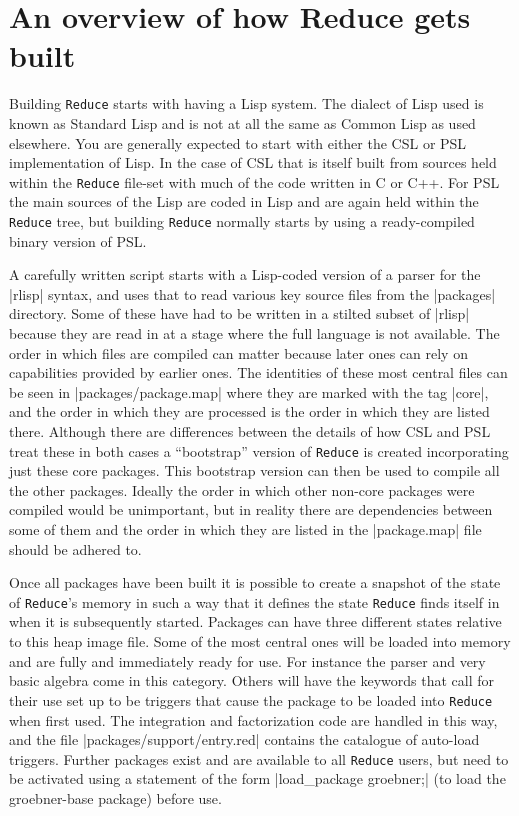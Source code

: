 \documentclass[12pt,twoside,openright]{memoir}
\newcommand{\reduce}{\texttt{Reduce}\xspace}
\begin{document}
\section{An overview of how Reduce gets built}

Building \reduce starts with having a Lisp system. The dialect of Lisp
used is known as Standard Lisp and is not at all the same as Common Lisp
as used elsewhere. You are generally expected to start with either the CSL
or PSL implementation of Lisp. In the case of CSL that is itself built
from sources held within the \reduce file-set with much of the code written
in C or C++. For PSL the main sources of the Lisp are coded in Lisp and are
again held within the \reduce tree, but building \reduce normally
starts by using a ready-compiled binary version of PSL.

A carefully written script starts with a Lisp-coded version of a parser for the
|rlisp| syntax, and uses that to read various key source files from the
|packages| directory. Some of these have had to be written in a stilted subset
of |rlisp| because they are read in at a stage where the full language is not
available. The order in which files are compiled can matter because later ones
can rely on capabilities provided by earlier ones. The identities of these most
central files can be seen in |packages/package.map| where they are marked with
the tag |core|\label{p:corepackages}, and the order in which they are processed
is the order in which they are listed there.  Although there are differences
between the details of how CSL and PSL treat these in both cases a
``bootstrap'' version of \reduce is created incorporating just these core
packages. This bootstrap version can then be used to compile all the other
packages. Ideally the order in which other non-core packages were compiled
would be unimportant, but in reality there are dependencies between some of
them and the order in which they are listed in the |package.map| file should be
adhered to.

Once all packages have been built it is possible to create a snapshot
of the state of \reduce's memory in such a way that it defines the
state \reduce finds itself in when it is subsequently started. Packages
can have three different states relative to this heap image file. Some
of the most central ones will be loaded into memory and are fully and
immediately ready for use. For instance the parser and very basic algebra
come in this category. Others will have the keywords that call for their
use set up to be triggers that cause the package to be loaded into \reduce
when first used. The integration and factorization code are handled in this
way, and the file |packages/support/entry.red| contains the catalogue of
auto-load triggers. Further packages exist and are available to all
\reduce users, but need to be activated using a statement of the
form |load_package groebner;| (to load the groebner-base package) before
use.
\end{document}
